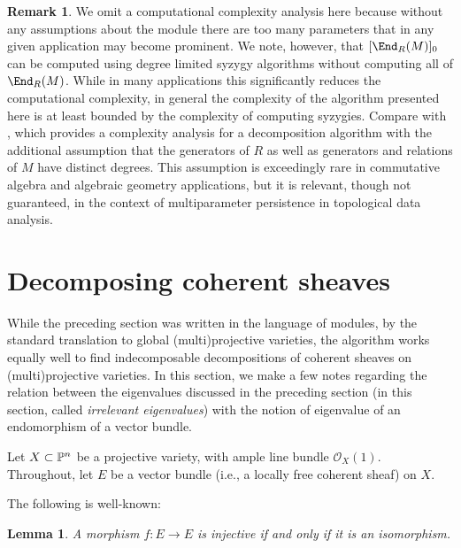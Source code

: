 \documentclass[12pt]{article}
\def\OO{\mathcal O}
\theoremstyle{theorem}
\numberwithin{thm}{section}
\newtheorem{lem}[thm]{Lemma}
\theoremstyle{definition}
\newtheorem{rem}[thm]{Remark}
\begin{document}
\begin{rem}
  We omit a computational complexity analysis here because without any assumptions about the module there are too many parameters that in any given application may become prominent. We note, however, that $[\End_R(M)]_0$ can be computed using degree limited syzygy algorithms without computing all of $\End_R(M)$. While in many applications this significantly reduces the computational complexity, in general the complexity of the algorithm presented here is at least bounded by the complexity of computing syzygies. Compare with \cite{DX22}, which provides a complexity analysis for a decomposition algorithm with the additional assumption that the generators of $R$ as well as generators and relations of $M$ have distinct degrees. This assumption is exceedingly rare in commutative algebra and algebraic geometry applications, but it is relevant, though not guaranteed, in the context of multiparameter persistence in topological data analysis.
\end{rem}

\section{Decomposing coherent sheaves}

While the preceding section was written in the language of modules, by the standard translation to global (multi)projective varieties, the algorithm works equally well to find indecomposable decompositions of coherent sheaves on (multi)projective varieties.
In this section, we make a few notes regarding the relation between the eigenvalues discussed in the preceding section (in this section, called \emph{irrelevant eigenvalues}) with the notion of eigenvalue of an endomorphism of a vector bundle.

Let $X\subset \P^n$ be a projective variety, with ample line bundle $\OO_X(1)$.
Throughout, let $E$ be a vector bundle (i.e., a locally free coherent sheaf) on $X$.

The following is well-known:

\begin{lem}{{\cite[Exercise~4.1]{Friedman}}}
A morphism $f:E\to E$ is injective if and only if it is an isomorphism.
\end{lem}


\end{document}
